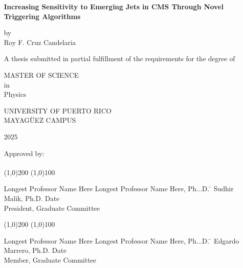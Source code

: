 



\thispagestyle{empty}
\begin{center}
\begin{singlespace}
\textbf{Increasing Sensitivity to Emerging Jets in CMS Through Novel Triggering Algorithms}
\end{singlespace}
\vspace{4 mm}
by
\\
\vspace{4 mm}
Roy F. Cruz Candelaria %
\vspace{4 mm}
\begin{singlespace}
A thesis submitted in partial fulfillment of the requirements for the degree of %
\end{singlespace}
\vspace{4 mm}
MASTER OF SCIENCE %
\\
in
\\
Physics %
\\
\vspace{4 mm}
\begin{singlespace}

UNIVERSITY OF PUERTO RICO
\\
MAYAG\"UEZ CAMPUS
\end{singlespace}

2025 %
\end{center}
\bigskip
\bigskip
\bigskip
\bigskip
\bigskip
\bigskip
\bigskip

  \noindent Approved by:
\\
\\

  \noindent
\line(1,0){200} \hspace{40 mm} \line(1,0){100}\\
  \noindent
\vspace{-1.75\baselineskip}
  \begin{tabbing}
Longest Professor Name Here Longest Professor Name Here, Ph...D. \=  \kill 
Sudhir Malik, Ph.D. \>  Date\\President, Graduate Committee  %
\end{tabbing}



  \noindent
\line(1,0){200} \hspace{40 mm} \line(1,0){100}\\
  \noindent
\vspace{-1.75\baselineskip}
  \begin{tabbing}
Longest Professor Name Here Longest Professor Name Here, Ph...D. \=  \kill 
Edgardo Marrero, Ph.D. \>  Date\\Member, Graduate Committee  %
\end{tabbing}


